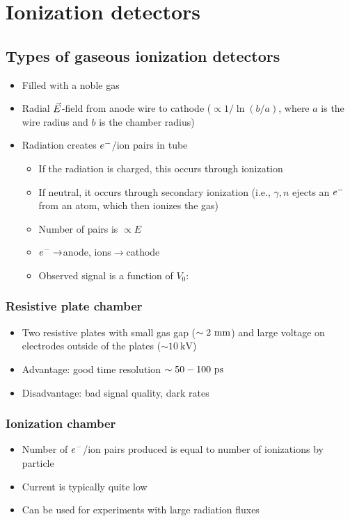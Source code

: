 \section{Ionization detectors}
\subsection{Types of gaseous ionization detectors}
\begin{itemize}
  \item Filled with a noble gas
  \item Radial $\vec{E}$-field from anode wire to cathode ($\propto 1/\ln(b/a)$, where $a$ is the wire radius and $b$ is the chamber radius)
  \item Radiation creates $e^{-}$/ion pairs in tube
  \begin{itemize}
    \item If the radiation is charged, this occurs through ionization
    \item If neutral, it occurs through secondary ionization (i.e., $\gamma,n$ ejects an $e^{-}$ from an atom, which then ionizes the gas)
    \item Number of pairs is $\propto E$
    \item $e^{-}\rightarrow$anode, ions$\rightarrow$cathode
    \item Observed signal is a function of $V_0$:
  \end{itemize}
\end{itemize}
\subsubsection{Resistive plate chamber}
\begin{itemize}
  \item Two resistive plates with small gas gap ($\sim 2~\text{mm}$) and large voltage on electrodes outside of the plates ($\sim 10~\text{kV}$)
  \item Advantage: good time resolution $\sim 50-100~\text{ps}$
  \item Disadvantage: bad signal quality, dark rates
\end{itemize}
\subsubsection{Ionization chamber}
\begin{itemize}
  \item Number of $e^{-}$/ion pairs produced is equal to number of ionizations by particle
  \item Current is typically quite low
  \item Can be used for experiments with large radiation fluxes
\end{itemize}
